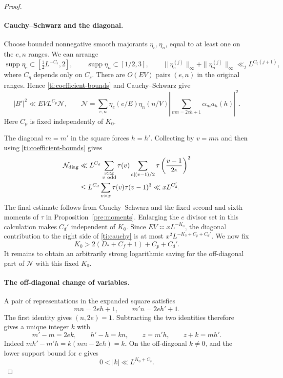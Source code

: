 \begin{proof}
\paragraph{Cauchy--Schwarz and the diagonal.}
Choose bounded nonnegative smooth majorants $\eta_e,\eta_n$, equal
to at least one on the $e,n$ ranges. We can arrange
\[
 \operatorname{supp}\eta_e\subset[\tfrac12L^{-C_s},2],
 \qquad \operatorname{supp}\eta_n\subset[1/2,3],
 \qquad
 \|\eta_e^{(j)}\|_\infty+\|\eta_n^{(j)}\|_\infty
                           \ll_j L^{C_{\eta}(j+1)},
\]
where $C_{\eta}$ depends only on $C_s$. There are $O(EV)$ pairs
$(e,n)$ in the original ranges. Hence \eqref{ti:coefficient-bounds}
and Cauchy--Schwarz give
\begin{equation}\label{ti:cauchy}
 |B'|^2\ll EVL^{C_p}\mathcal N,\qquad
 \mathcal N=\sum_{e,n}\eta_e(e/E)\eta_n(n/V)
                \left|\sum_{mn=2eh+1}\alpha_m a_h(h)\right|^2.
\end{equation}
Here $C_p$ is fixed independently of $K_0$.

The diagonal $m=m'$ in the square forces $h=h'$. Collecting by
$v=mn$ and then using \eqref{ti:coefficient-bounds} gives
\begin{align}
 \mathcal N_{\mathrm{diag}}
 &\ll L^{C_d}\sum_{\substack{v\asymp x\\v\ {\rm odd}}}
       \tau(v)\sum_{e\mid(v-1)/2}
                   \tau\left(\frac{v-1}{2e}\right)^2\notag\\
 &\le L^{C_d}\sum_{v\asymp x}\tau(v)\tau(v-1)^3
 \ll xL^{C_d'}.
 \label{ti:diagonal}
\end{align}
The final estimate follows from Cauchy--Schwarz and the fixed second
and sixth moments of $\tau$ in Proposition~\ref{pre:moments}.
Enlarging the $e$ divisor set in this
calculation makes $C_d'$ independent of $K_0$. Since
$EV\asymp xL^{-K_0}$, the diagonal contribution to the right side
of \eqref{ti:cauchy} is at most
$x^2L^{-K_0+C_p+C_d'}$. We now fix
\begin{equation}\label{ti:K-choice}
                  K_0>2(D_*+C_f+1)+C_p+C_d'.
\end{equation}
It remains to obtain an arbitrarily strong logarithmic saving for
the off-diagonal part of $\mathcal N$ with this fixed $K_0$.

\paragraph{The off-diagonal change of variables.}
A pair of representations in the expanded square satisfies
\[
                    mn=2eh+1,\qquad m'n=2eh'+1.
\]
The first identity gives $(n,2e)=1$. Subtracting the two identities
therefore gives a unique integer $k$ with
\begin{equation}\label{ti:determinant-forward}
 m'-m=2ek,\qquad h'-h=kn,\qquad
 z=m'h,\qquad z+k=mh'.
\end{equation}
Indeed $mh'-m'h=k(mn-2eh)=k$. On the off-diagonal $k\ne0$, and
the lower support bound for $e$ gives
\begin{equation}\label{ti:k-range}
                         0<|k|\ll L^{K_0+C_s}.
\end{equation}


\end{proof}
